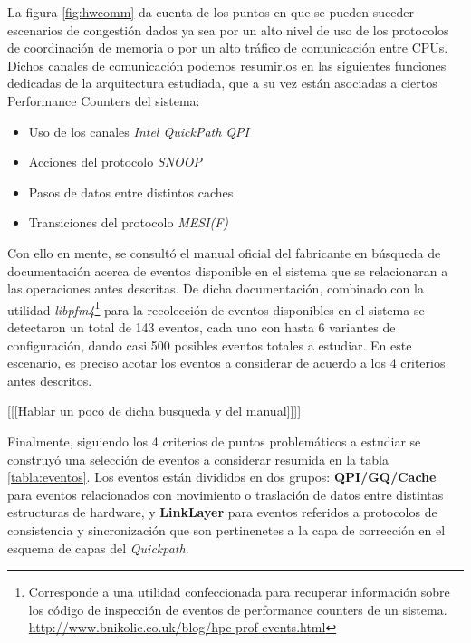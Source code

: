 La figura \ref{fig:hwcomm} da cuenta de los puntos en que se pueden suceder escenarios de congestión dados ya sea por un alto nivel de uso de los protocolos de coordinación de memoria o por un alto tráfico de comunicación entre CPUs. Dichos canales de comunicación podemos resumirlos en las siguientes funciones dedicadas de la arquitectura estudiada, que a su vez están asociadas a ciertos Performance Counters del sistema:

\begin{itemize}
\item Uso de los canales \emph{Intel QuickPath QPI}
\item Acciones del protocolo \emph{SNOOP}
\item Pasos de datos entre distintos caches
\item Transiciones del protocolo \emph{MESI(F)}
\end{itemize}


Con ello en mente, se consultó el manual oficial del fabricante \cite{manual:bigbigevents} en búsqueda de documentación acerca de eventos disponible en el sistema que se relacionaran a las operaciones antes descritas. De dicha documentación, combinado con la utilidad \emph{libpfm4}\footnote{Corresponde a una utilidad confeccionada para recuperar información sobre los código de inspección de eventos de performance counters de un sistema. \url{http://www.bnikolic.co.uk/blog/hpc-prof-events.html}} para la recolección de eventos disponibles en el sistema se detectaron un total de 143 eventos, cada uno con hasta 6 variantes de configuración, dando casi 500 posibles eventos totales a estudiar. En este escenario, es preciso acotar los eventos a considerar de acuerdo a los 4 criterios antes descritos.


[[[Hablar un poco de dicha busqueda y del manual]]]]

Finalmente, siguiendo los 4 criterios de puntos problemáticos a estudiar se construyó una selección de eventos a considerar resumida en la tabla \ref{tabla:eventos}. Los eventos están divididos en dos grupos: \textbf{QPI/GQ/Cache} para eventos relacionados con movimiento o traslación de datos entre distintas estructuras de hardware, y \textbf{LinkLayer} para eventos referidos a protocolos de consistencia y sincronización que son pertinenetes a la capa de corrección en el esquema de capas del \emph{Quickpath}.

